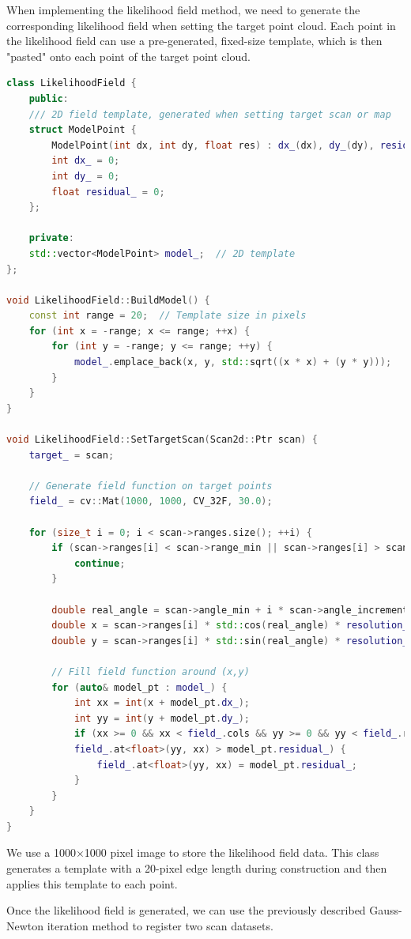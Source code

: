 When implementing the likelihood field method, we need to generate the corresponding likelihood field when setting the target point cloud. Each point in the likelihood field can use a pre-generated, fixed-size template, which is then "pasted" onto each point of the target point cloud.  

\begin{lstlisting}[language=c++,caption=src/ch6/likelihood\_field.cc]  
class LikelihoodField {  
	public:  
	/// 2D field template, generated when setting target scan or map  
	struct ModelPoint {  
		ModelPoint(int dx, int dy, float res) : dx_(dx), dy_(dy), residual_(res) {}  
		int dx_ = 0;  
		int dy_ = 0;  
		float residual_ = 0;  
	};  
	
	private:  
	std::vector<ModelPoint> model_;  // 2D template  
};  

void LikelihoodField::BuildModel() {  
	const int range = 20;  // Template size in pixels  
	for (int x = -range; x <= range; ++x) {  
		for (int y = -range; y <= range; ++y) {  
			model_.emplace_back(x, y, std::sqrt((x * x) + (y * y)));  
		}  
	}  
}  

void LikelihoodField::SetTargetScan(Scan2d::Ptr scan) {  
	target_ = scan;  
	
	// Generate field function on target points  
	field_ = cv::Mat(1000, 1000, CV_32F, 30.0);  
	
	for (size_t i = 0; i < scan->ranges.size(); ++i) {  
		if (scan->ranges[i] < scan->range_min || scan->ranges[i] > scan->range_max) {  
			continue;  
		}  
		
		double real_angle = scan->angle_min + i * scan->angle_increment;  
		double x = scan->ranges[i] * std::cos(real_angle) * resolution_ + 500;  
		double y = scan->ranges[i] * std::sin(real_angle) * resolution_ + 500;  
		
		// Fill field function around (x,y)  
		for (auto& model_pt : model_) {  
			int xx = int(x + model_pt.dx_);  
			int yy = int(y + model_pt.dy_);  
			if (xx >= 0 && xx < field_.cols && yy >= 0 && yy < field_.rows &&  
			field_.at<float>(yy, xx) > model_pt.residual_) {  
				field_.at<float>(yy, xx) = model_pt.residual_;  
			}  
		}  
	}  
}  
\end{lstlisting}  

We use a 1000$\times$1000 pixel image to store the likelihood field data. This class generates a template with a 20-pixel edge length during construction and then applies this template to each point.  

Once the likelihood field is generated, we can use the previously described Gauss-Newton iteration method to register two scan datasets.  

